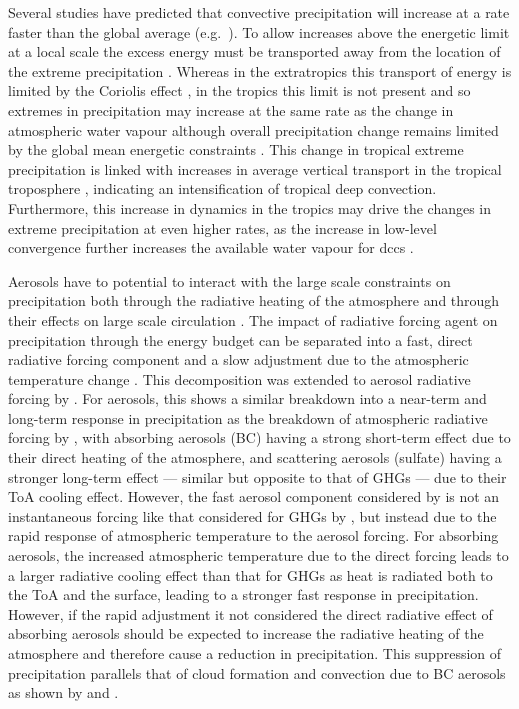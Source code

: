 Several studies have predicted that convective precipitation will increase at a rate faster than the global average (e.g.\ \citet{ogorman_physical_2009, muller_intensification_2011, ogorman_precipitation_2015, donat_more_2016}).
To allow increases above the energetic limit at a local scale the excess energy must be transported away from the location of the extreme precipitation \citep{muller_energetic_2011}.
Whereas in the extratropics this transport of energy is limited by the Coriolis effect \citep{ogorman_physical_2009}, in the tropics this limit is not present and so extremes in precipitation may increase at the same rate as the change in atmospheric water vapour \citep{ogorman_energetic_2012} although overall precipitation change remains limited by the global mean energetic constraints \citep{allen_constraints_2002}.
This change in tropical extreme precipitation is linked with increases in average vertical transport in the tropical troposphere \citep{muller_energetic_2011}, indicating an intensification of tropical deep convection.
Furthermore, this increase in dynamics in the tropics may drive the changes in extreme precipitation at even higher rates, as the increase in low-level convergence further increases the available water vapour for \acrshort{dcc}s \citep{ogorman_energetic_2012}.


Aerosols have to potential to interact with the large scale constraints on precipitation both through the radiative heating of the atmosphere \citep{suzuki_perturbations_2019} and through their effects on large scale circulation \citep{bollasina_anthropogenic_2011, nober_sensitivity_2003}. 
The impact of radiative forcing agent on precipitation through the energy budget can be separated into a fast, direct radiative forcing component and a slow adjustment due to the atmospheric temperature change \citep{allen_constraints_2002}. This decomposition was extended to aerosol radiative forcing by \citet{richardson_drivers_2018}. For aerosols, this shows a similar breakdown into a near-term and long-term response in precipitation as the breakdown of atmospheric radiative forcing by \citet{suzuki_perturbations_2019}, with absorbing aerosols (BC) having a strong short-term effect due to their direct heating of the atmosphere, and scattering aerosols (sulfate) having a stronger long-term effect --- similar but opposite to that of GHGs --- due to their ToA cooling effect.
However, the fast aerosol component considered by \citet{richardson_drivers_2018} is not an instantaneous forcing like that considered for GHGs by \citet{allen_constraints_2002}, but instead due to the rapid response of atmospheric temperature to the aerosol forcing.
For absorbing aerosols, the increased atmospheric temperature due to the direct forcing leads to a larger radiative cooling effect than that for GHGs as heat is radiated both to the ToA and the surface, leading to a stronger fast response in precipitation. 
However, if the rapid adjustment it not considered the direct radiative effect of absorbing aerosols should be expected to increase the radiative heating of the atmosphere and therefore cause a reduction in precipitation.
This suppression of precipitation parallels that of cloud formation and convection due to BC aerosols as shown by \citet{koren_smoke_2008} and \citet{fan_effects_2008}.

